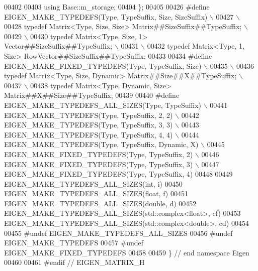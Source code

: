 \begin{DoxyCode}
00402 
00403     \textcolor{keyword}{using} Base::m\_storage;
00404 \};
00405 
00426 \textcolor{preprocessor}{#define EIGEN\_MAKE\_TYPEDEFS(Type, TypeSuffix, Size, SizeSuffix)   \(\backslash\)}
00427 \textcolor{preprocessor}{                                    \(\backslash\)}
00428 \textcolor{preprocessor}{typedef Matrix<Type, Size, Size> Matrix##SizeSuffix##TypeSuffix;  \(\backslash\)}
00429 \textcolor{preprocessor}{                                    \(\backslash\)}
00430 \textcolor{preprocessor}{typedef Matrix<Type, Size, 1>    Vector##SizeSuffix##TypeSuffix;  \(\backslash\)}
00431 \textcolor{preprocessor}{                                    \(\backslash\)}
00432 \textcolor{preprocessor}{typedef Matrix<Type, 1, Size>    RowVector##SizeSuffix##TypeSuffix;}
00433 
00434 \textcolor{preprocessor}{#define EIGEN\_MAKE\_FIXED\_TYPEDEFS(Type, TypeSuffix, Size)         \(\backslash\)}
00435 \textcolor{preprocessor}{                                    \(\backslash\)}
00436 \textcolor{preprocessor}{typedef Matrix<Type, Size, Dynamic> Matrix##Size##X##TypeSuffix;  \(\backslash\)}
00437 \textcolor{preprocessor}{                                    \(\backslash\)}
00438 \textcolor{preprocessor}{typedef Matrix<Type, Dynamic, Size> Matrix##X##Size##TypeSuffix;}
00439 
00440 \textcolor{preprocessor}{#define EIGEN\_MAKE\_TYPEDEFS\_ALL\_SIZES(Type, TypeSuffix) \(\backslash\)}
00441 \textcolor{preprocessor}{EIGEN\_MAKE\_TYPEDEFS(Type, TypeSuffix, 2, 2) \(\backslash\)}
00442 \textcolor{preprocessor}{EIGEN\_MAKE\_TYPEDEFS(Type, TypeSuffix, 3, 3) \(\backslash\)}
00443 \textcolor{preprocessor}{EIGEN\_MAKE\_TYPEDEFS(Type, TypeSuffix, 4, 4) \(\backslash\)}
00444 \textcolor{preprocessor}{EIGEN\_MAKE\_TYPEDEFS(Type, TypeSuffix, Dynamic, X) \(\backslash\)}
00445 \textcolor{preprocessor}{EIGEN\_MAKE\_FIXED\_TYPEDEFS(Type, TypeSuffix, 2) \(\backslash\)}
00446 \textcolor{preprocessor}{EIGEN\_MAKE\_FIXED\_TYPEDEFS(Type, TypeSuffix, 3) \(\backslash\)}
00447 \textcolor{preprocessor}{EIGEN\_MAKE\_FIXED\_TYPEDEFS(Type, TypeSuffix, 4)}
00448 
00449 EIGEN\_MAKE\_TYPEDEFS\_ALL\_SIZES(\textcolor{keywordtype}{int},                  i)
00450 EIGEN\_MAKE\_TYPEDEFS\_ALL\_SIZES(\textcolor{keywordtype}{float},                f)
00451 EIGEN\_MAKE\_TYPEDEFS\_ALL\_SIZES(\textcolor{keywordtype}{double},               d)
00452 EIGEN\_MAKE\_TYPEDEFS\_ALL\_SIZES(std::complex<float>,  cf)
00453 EIGEN\_MAKE\_TYPEDEFS\_ALL\_SIZES(std::complex<double>, cd)
00454 
00455 \textcolor{preprocessor}{#undef EIGEN\_MAKE\_TYPEDEFS\_ALL\_SIZES}
00456 \textcolor{preprocessor}{#undef EIGEN\_MAKE\_TYPEDEFS}
00457 \textcolor{preprocessor}{#undef EIGEN\_MAKE\_FIXED\_TYPEDEFS}
00458 
00459 \} \textcolor{comment}{// end namespace Eigen}
00460 
00461 \textcolor{preprocessor}{#endif // EIGEN\_MATRIX\_H}
\end{DoxyCode}
